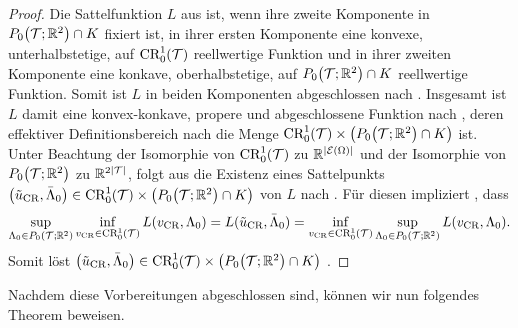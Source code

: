 \begin{proof}
  Die Sattelfunktion $L$ aus  ist,
  wenn ihre zweite Komponente in $P_0\!\left(\mathcal{T};\mathbb{R}^2\right)\cap K$ fixiert
  ist, in ihrer ersten Komponente eine konvexe, unterhalbstetige, auf
  $\textup{CR}^1_0(\mathcal{T})$ reellwertige Funktion und in ihrer zweiten Komponente eine
  konkave, oberhalbstetige, auf $P_0\!\left(\mathcal{T};\mathbb{R}^2\right)\cap K$
  reellwertige Funktion.
  Somit ist $L$ in beiden Komponenten abgeschlossen nach \cite[S. 52,
  308]{Roc70}.  
  Insgesamt ist $L$ damit eine konvex-konkave, propere und abgeschlossene
  Funktion nach \cite[S. 349, 362 f.]{Roc70}, deren effektiver
  Definitionsbereich nach \cite[362]{Roc70} die Menge $\textup{CR}^1_0(\mathcal{T})\times
  \left( P_0\!\left(\mathcal{T};\mathbb{R}^2\right)\cap K\right)$ ist.
  Unter Beachtung der Isomorphie von $\textup{CR}^1_0(\mathcal{T})$ zu
  $\mathbb{R}^{|\mathcal{E}(\Omega)|}$ und der Isomorphie von
  $P_0\!\left(\mathcal{T};\mathbb{R}^2\right)$ zu $\mathbb{R}^{2|\mathcal{T}|}$, folgt aus 
  \cite[S. 397, Theorem 37.6]{Roc70} die Existenz eines Sattelpunkts
  $\left(\tilde{u}_{\textup{CR}},\bar\Lambda_0\right)\in \textup{CR}^1_0(\mathcal{T})\times \left(
  P_0\!\left(\mathcal{T};\mathbb{R}^2\right)\cap K\right)$ von $L$ nach \cite[380]{Roc70}.
  Für diesen impliziert \cite[S. 380, Lemma 36.2]{Roc70}, dass 
  \begin{align*}
    \sup_{\Lambda_0\in P_0\left(\mathcal{T};\mathbb{R}^2\right)}\inf_{v_\textup{CR}\in\textup{CR}^1_0(\mathcal{T})}
    L(v_\textup{CR},\Lambda_0)
    =
    L(\tilde{u}_{\textup{CR}},\bar\Lambda_0) 
    = 
    \inf_{v_\textup{CR}\in\textup{CR}^1_0(\mathcal{T})}\sup_{\Lambda_0\in P_0\left(\mathcal{T};\mathbb{R}^2\right)}
    L(v_\textup{CR},\Lambda_0).
  \end{align*}
  Somit löst $\left(\tilde{u}_{\textup{CR}},\bar\Lambda_0\right)\in \textup{CR}^1_0(\mathcal{T})\times
  \left( P_0\!\left(\mathcal{T};\mathbb{R}^2\right)\cap K\right)$
  .
\end{proof}

Nachdem diese Vorbereitungen abgeschlossen sind, können wir nun folgendes
Theorem beweisen.

